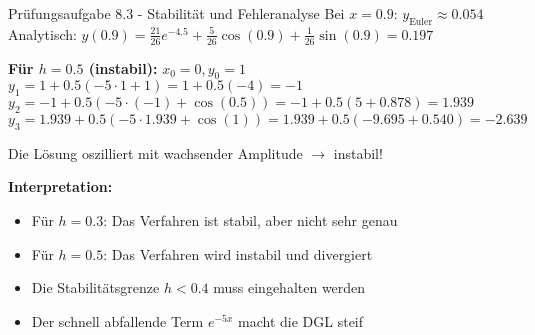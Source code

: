 \begin{example2}{Prüfungsaufgabe 8.3 - Stabilität und Fehleranalyse}
Bei $x = 0.9$: $y_{\text{Euler}} \approx 0.054$
Analytisch: $y(0.9) = \frac{21}{26}e^{-4.5} + \frac{5}{26}\cos(0.9) + \frac{1}{26}\sin(0.9) = 0.197$

\textbf{Für $h = 0.5$ (instabil):}
$x_0 = 0, y_0 = 1$
$y_1 = 1 + 0.5(-5 \cdot 1 + 1) = 1 + 0.5(-4) = -1$
$y_2 = -1 + 0.5(-5 \cdot (-1) + \cos(0.5)) = -1 + 0.5(5 + 0.878) = 1.939$
$y_3 = 1.939 + 0.5(-5 \cdot 1.939 + \cos(1)) = 1.939 + 0.5(-9.695 + 0.540) = -2.639$

Die Lösung oszilliert mit wachsender Amplitude $\rightarrow$ instabil!

\textbf{Interpretation:}
\begin{itemize}
    \item Für $h = 0.3$: Das Verfahren ist stabil, aber nicht sehr genau
    \item Für $h = 0.5$: Das Verfahren wird instabil und divergiert
    \item Die Stabilitätsgrenze $h < 0.4$ muss eingehalten werden
    \item Der schnell abfallende Term $e^{-5x}$ macht die DGL steif
\end{itemize}
\end{example2}

